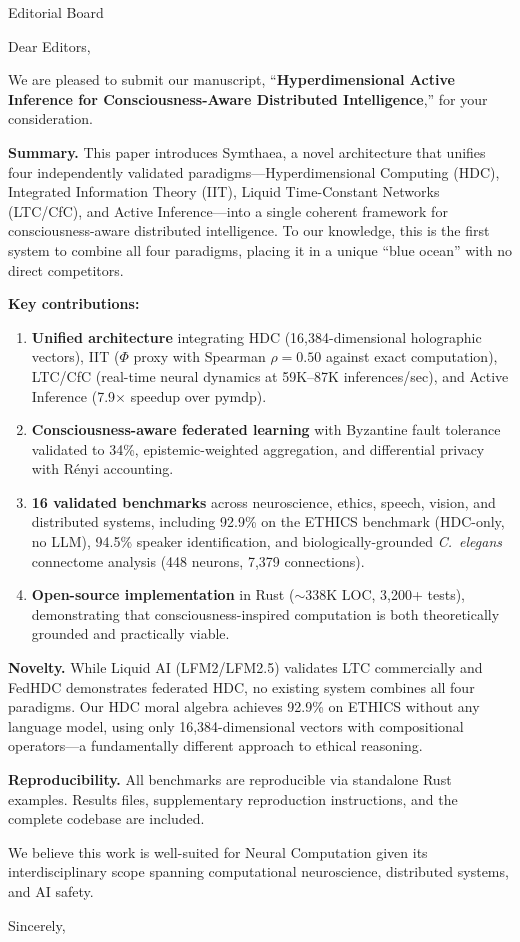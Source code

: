 \documentclass[11pt]{letter}
\begin{document}
\begin{letter}{Editorial Board}

\opening{Dear Editors,}

We are pleased to submit our manuscript, ``\textbf{Hyperdimensional Active Inference for Consciousness-Aware Distributed Intelligence},'' for your consideration.

\textbf{Summary.} This paper introduces Symthaea, a novel architecture that unifies four independently validated paradigms---Hyperdimensional Computing (HDC), Integrated Information Theory (IIT), Liquid Time-Constant Networks (LTC/CfC), and Active Inference---into a single coherent framework for consciousness-aware distributed intelligence. To our knowledge, this is the first system to combine all four paradigms, placing it in a unique ``blue ocean'' with no direct competitors.

\textbf{Key contributions:}
\begin{enumerate}
    \item \textbf{Unified architecture} integrating HDC (16,384-dimensional holographic vectors), IIT ($\Phi$ proxy with Spearman $\rho = 0.50$ against exact computation), LTC/CfC (real-time neural dynamics at 59K--87K inferences/sec), and Active Inference (7.9$\times$ speedup over pymdp).
    \item \textbf{Consciousness-aware federated learning} with Byzantine fault tolerance validated to 34\%, epistemic-weighted aggregation, and differential privacy with R\'{e}nyi accounting.
    \item \textbf{16 validated benchmarks} across neuroscience, ethics, speech, vision, and distributed systems, including 92.9\% on the ETHICS benchmark (HDC-only, no LLM), 94.5\% speaker identification, and biologically-grounded \textit{C.~elegans} connectome analysis (448 neurons, 7,379 connections).
    \item \textbf{Open-source implementation} in Rust ($\sim$338K LOC, 3,200+ tests), demonstrating that consciousness-inspired computation is both theoretically grounded and practically viable.
\end{enumerate}

\textbf{Novelty.} While Liquid AI (LFM2/LFM2.5) validates LTC commercially and FedHDC demonstrates federated HDC, no existing system combines all four paradigms. Our HDC moral algebra achieves 92.9\% on ETHICS without any language model, using only 16,384-dimensional vectors with compositional operators---a fundamentally different approach to ethical reasoning.

\textbf{Reproducibility.} All benchmarks are reproducible via standalone Rust examples. Results files, supplementary reproduction instructions, and the complete codebase are included.

We believe this work is well-suited for Neural Computation given its interdisciplinary scope spanning computational neuroscience, distributed systems, and AI safety.

\closing{Sincerely,}

\end{letter}
\end{document}
